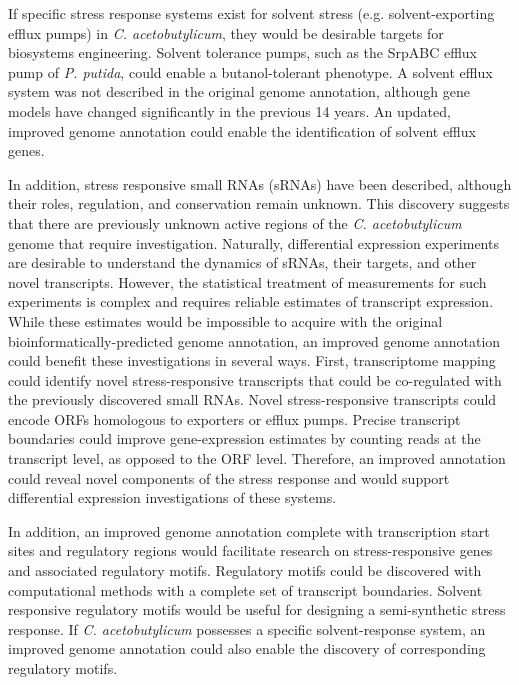 If specific stress response systems exist for solvent stress (e.g. solvent-exporting efflux pumps) in \textit{C. acetobutylicum}, they would be desirable targets for biosystems engineering. Solvent tolerance pumps, such as the SrpABC efflux pump of \textit{P. putida}, could enable a butanol-tolerant phenotype.\cite{201} A solvent efflux system was not described in the original genome annotation,\cite{91} although gene models have changed significantly in the previous 14 years. An updated, improved genome annotation could enable the identification of solvent efflux genes.

In addition, stress responsive small RNAs (sRNAs) have been described,\cite{39} although their roles, regulation, and conservation remain unknown. This discovery suggests that there are previously unknown active regions of the \textit{C. acetobutylicum} genome that require investigation. Naturally, differential expression experiments are desirable to understand the dynamics of sRNAs, their targets, and other novel transcripts. However, the statistical treatment of measurements for such experiments is complex and requires reliable estimates of transcript expression.\cite{111,112,197} While these estimates would be impossible to acquire with the original bioinformatically-predicted genome annotation, an improved genome annotation could benefit these investigations in several ways. First, transcriptome mapping could identify novel stress-responsive transcripts that could be co-regulated with the previously discovered small RNAs.\cite{39} Novel stress-responsive transcripts could encode ORFs homologous to exporters or efflux pumps. Precise transcript boundaries could improve gene-expression estimates by counting reads at the transcript level, as opposed to the ORF level. Therefore, an improved annotation could reveal novel components of the stress response and would support differential expression investigations of these systems.

In addition, an improved genome annotation complete with transcription start sites and regulatory regions would facilitate research on stress-responsive genes and associated regulatory motifs. Regulatory motifs could be discovered with computational methods\cite{5,35} with a complete set of transcript boundaries.\cite{105,106,107} Solvent responsive regulatory motifs would be useful for designing a semi-synthetic stress response.\cite{45,46} If \textit{C. acetobutylicum} possesses a specific solvent-response system, an improved genome annotation could also enable the discovery of corresponding regulatory motifs.

